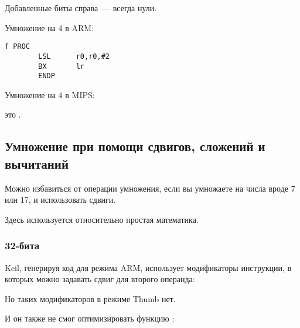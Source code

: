 Добавленные биты справа~--- всегда нули.

\ifdefined\IncludeARM
Умножение на 4 в ARM:

\begin{lstlisting}[caption=\NonOptimizingKeilVI (\ARMMode)]
f PROC
        LSL      r0,r0,#2
        BX       lr
        ENDP
\end{lstlisting}
\fi

\ifdefined\IncludeMIPS
Умножение на 4 в MIPS:



 это .
\fi

\subsection{Умножение при помощи сдвигов, сложений и вычитаний}
\label{multiplication_using_shifts_adds_subs}

Можно избавиться от операции умножения, если вы умножаете на числа вроде 7 или 17,
и использовать сдвиги.

Здесь используется относительно простая математика.

\subsubsection{32-бита}






\ifdefined\IncludeARM
{}

Keil, генерируя код для режима ARM, использует модификаторы инструкции, в которых можно задавать
сдвиг для второго операнда:



Но таких модификаторов в режиме Thumb нет.

И он также не смог оптимизировать функцию :


\fi

